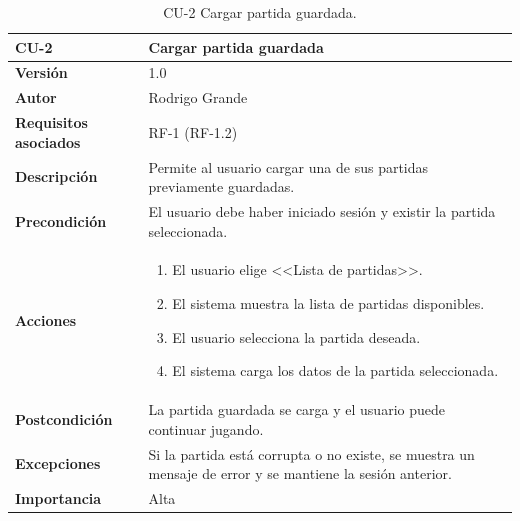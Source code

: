 \begin{table}[p]
	\centering
	\begin{tabularx}{\linewidth}{ p{} p{} }
		\toprule
		\textbf{CU-2} & \textbf{Cargar partida guardada}\\
		\toprule
		\textbf{Versión}              & 1.0    \\
		\textbf{Autor}                & Rodrigo Grande \\
		\textbf{Requisitos asociados} & RF-1 (RF-1.2) \\
		\textbf{Descripción}          & Permite al usuario cargar una de sus partidas previamente guardadas.\\
		\textbf{Precondición}         & El usuario debe haber iniciado sesión y existir la partida seleccionada. \\
		\textbf{Acciones}             &
		\begin{enumerate}
			\def\labelenumi{\arabic{enumi}.}
			\tightlist
			\item El usuario elige <<Lista de partidas>>.
			\item El sistema muestra la lista de partidas disponibles.
			\item El usuario selecciona la partida deseada.
			\item El sistema carga los datos de la partida seleccionada.
		\end{enumerate}\\
		\textbf{Postcondición}        & La partida guardada se carga y el usuario puede continuar jugando. \\
		\textbf{Excepciones}          & Si la partida está corrupta o no existe, se muestra un mensaje de error y se mantiene la sesión anterior. \\
		\textbf{Importancia}          & Alta \\
		\bottomrule
	\end{tabularx}
	\caption{CU-2 Cargar partida guardada.}
	\label{cu:cargar-partida}
\end{table}

